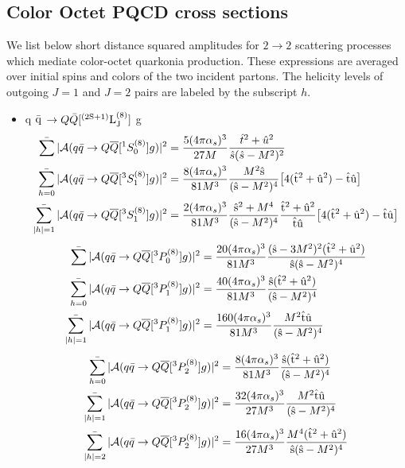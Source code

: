 \documentclass[aps,prc,preprint,superscriptaddress,showpacs,showkeys,amsmath]{revtex4-1}
\begin{document}
\subsection{\bf Color Octet PQCD cross sections}
 We list below short distance squared amplitudes for $2 \to 2$ scattering 
processes which mediate color-octet quarkonia production. 
These expressions are averaged over initial spins and colors of the two 
incident partons.  The helicity levels of outgoing $J=1$ and $J=2$ pairs 
are labeled by the subscript $h$.  
\begin{itemize}
\item q $\bar{\rm q}$ $\rightarrow Q{\bar{Q}}[{\rm ^{(2S+1)}L_{J}^{(8)}}]$ g
\begin{equation}
\begin{split}
\mathop{{\bar{\sum}}} | {\cal A}(q{\bar{q}} \to {Q{\overline Q}[ ^1S_0^{(8)}]} g) |^2 &= {5 (4\pi {\alpha_{s}})^3 \over 27 M} {{\hat{t}}^2+{\hat{u}}^2 \over {\hat{s}} ({\hat{s}}-M^2)^2}\\
\mathop{{\bar{\sum_{h=0}}}} | {\cal A}(q{\bar{q}} \to Q{\overline Q}[ ^3S_1^{(8)}] g) |^2 &= {8 (4\pi {\alpha_{s}})^3 \over 81 M^3} {M^2 \hat{\rm s} \over (\hat{\rm s}-M^2)^4} 
 \bigl[4(\hat{\rm t}^2+\hat{\rm u}^2)-\hat{\rm t}\hat{\rm u} \bigr]\\
\mathop{{\bar{\sum_{|h|=1}}}} | {\cal A}(q{\bar{q}} \to Q{\overline Q}[ ^3S_1^{(8)}] g) |^2 &= {2 (4\pi {\alpha_{s}})^3 \over 81 M^3} {\hat{\rm s}^2+M^4 \over (\hat{\rm s}-M^2)^4} 
 {\hat{\rm t}^2+\hat{\rm u}^2 \over \hat{\rm t}\hat{\rm u}} \bigl[4(\hat{\rm t}^2+\hat{\rm u}^2)-\hat{\rm t}\hat{\rm u} \bigr] 
\end{split}  
\end{equation}
\begin{equation}
\begin{split}
\mathop{{\bar{\sum}}} | {\cal A}(q{\bar{q}} \to Q{\overline Q}[ ^3P_0^{(8)}] g) |^2 &= {20 (4\pi {\alpha_{s}})^3 \over 81 M^3} {(\hat{\rm s}-3 M^2)^2 
(\hat{\rm t}^2+\hat{\rm u}^2) \over \hat{\rm s}(\hat{\rm s}-M^2)^4}\\
\mathop{{\bar{\sum_{h=0}}}} | {\cal A}(q{\bar{q}} \to Q{\overline Q}[ ^3P_1^{(8)}] g) |^2 &={40 (4\pi {\alpha_{s}})^3 \over 81 M^3} {\hat{\rm s}(\hat{\rm t}^2+\hat{\rm u}^2)
\over (\hat{\rm s}-M^2)^4} \\
\mathop{{\bar{\sum_{|h|=1}}}} | {\cal A}(q{\bar{q}} \to Q{\overline Q}[ ^3P_1^{(8)}] g) |^2 &= {160 (4\pi {\alpha_{s}})^3 \over 81 M^3} {M^2 \hat{\rm t} \hat{\rm u}\over (\hat{\rm s}-M^2)^4} 
\end{split}  
\end{equation}
\begin{equation}
\begin{split}
\mathop{{\bar{\sum_{h=0}}}} | {\cal A}(q{\bar{q}} \to Q{\overline Q}[ ^3P_2^{(8)}] g) |^2 &= {8 (4\pi {\alpha_{s}})^3 \over 81 M^3} {\hat{\rm s}(\hat{\rm t}^2+\hat{\rm u}^2)\over (\hat{\rm s}-M^2)^4}\\ 
\mathop{{\bar{\sum_{|h|=1}}}} | {\cal A}(q{\bar{q}} \to Q{\overline Q}[ ^3P_2^{(8)}] g) |^2 &={32 (4\pi {\alpha_{s}})^3 \over 27 M^3} {M^2 \hat{\rm t}\hat{\rm u}\over (\hat{\rm s}-M^2)^4}\\ 
\mathop{{\bar{\sum_{|h|=2}}}} | {\cal A}(q{\bar{q}} \to Q{\overline Q}[ ^3P_2^{(8)}] g) |^2 &={16 (4\pi {\alpha_{s}})^3 \over 27 M^3} {M^4 (\hat{\rm t}^2+\hat{\rm u}^2)\over \hat{\rm s}(\hat{\rm s}-M^2)^4}
\end{split}  
\end{equation}


\end{itemize}
\end{document}
